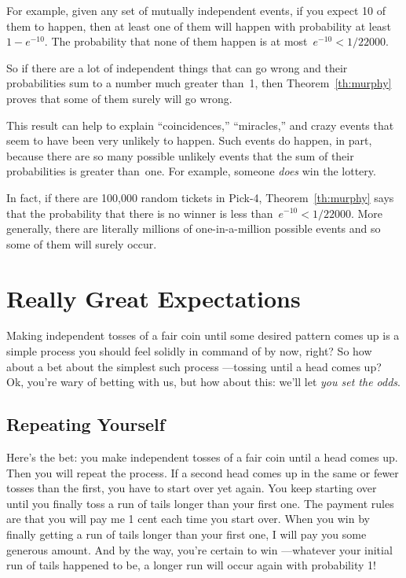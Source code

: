 For example, given any set of mutually independent events, if you
expect 10 of them to happen, then at least one of them will happen
with probability at least~$1 - e^{-10}$.  The probability that none of
them happen is at most~$e^{-10} < 1/22000$.

So if there are a lot of independent things that can go wrong and their
probabilities sum to a number much greater than~1, then
Theorem~\ref{th:murphy} proves that some of them surely will go wrong.

This result can help to explain ``coincidences,'' ``miracles,'' and
crazy events that seem to have been very unlikely to happen.  Such
events do happen, in part, because there are so many possible unlikely
events that the sum of their probabilities is greater than~one.  For
example, someone \emph{does} win the lottery.

In fact, if there are 100,000 random tickets in Pick-4,
Theorem~\ref{th:murphy} says that the probability that there is no
winner is less than~$e^{-10} < 1/22000$.  More generally, there are
literally millions of one-in-a-million possible events and so some of
them will surely occur.

\begin{problems}
\practiceproblems
{}

\classproblems
{}

\homeworkproblems
{}

\end{problems}

\section{Really Great Expectations}\label{infinite_expect_sec}

Making independent tosses of a fair coin until some desired pattern
comes up is a simple process you should feel solidly in command of by
now, right?  So how about a bet about the simplest such process
---tossing until a head comes up?  Ok, you're wary of betting with us,
but how about this: we'll let \emph{you set the odds}.

\subsection{Repeating Yourself}\label{infinite_repeat_subsec}
Here's the bet: you make independent tosses of a fair coin until a
head comes up.  Then you will repeat the process.  If a second head
comes up in the same or fewer tosses than the first, you have to start
over yet again.  You keep starting over until you finally toss a run
of tails longer than your first one.  The payment rules are that you
will pay me 1 cent each time you start over.  When you win by finally
getting a run of tails longer than your first one, I will pay you some
generous amount.  And by the way, you're certain to win ---whatever
your initial run of tails happened to be, a longer run will occur
again with probability 1!

